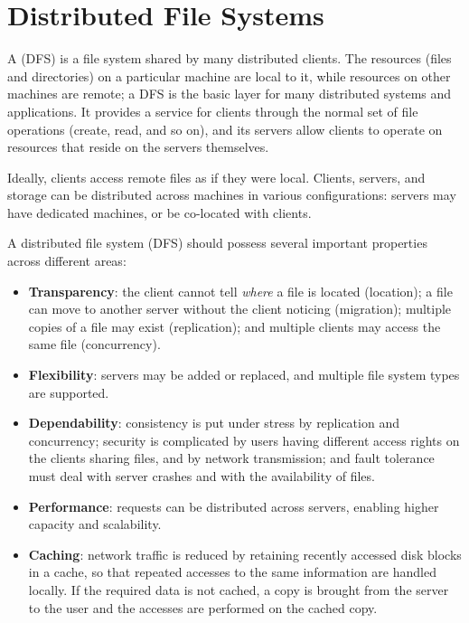 \section{Distributed File Systems} \label{sec:dfs}

\begin{definitionblock}
    A  (DFS) is a file system shared by many distributed clients. The resources (files and directories) on a particular machine are local to it, while resources on other machines are remote; a DFS is the basic layer for many distributed systems and applications. It provides a service for clients through the normal set of file operations (create, read, and so on), and its servers allow clients to operate on resources that reside on the servers themselves.
\end{definitionblock}

Ideally, clients access remote files as if they were local. Clients, servers, and storage can be distributed across machines in various configurations: servers may have dedicated machines, or be co-located with clients. 

\medskip

A distributed file system (DFS) should possess several important properties across different areas:

\smallskip

\begin{itemize}
    \item \textbf{Transparency}: the client cannot tell \emph{where} a file is located (location); a file can move to another server without the client noticing (migration); multiple copies of a file may exist (replication); and multiple clients may access the same file (concurrency).
    \item \textbf{Flexibility}: servers may be added or replaced, and multiple file system types are supported.
    \item \textbf{Dependability}: consistency is put under stress by replication and concurrency; security is complicated by users having different access rights on the clients sharing files, and by network transmission; and fault tolerance must deal with server crashes and with the availability of files.
    \item \textbf{Performance}: requests can be distributed across servers, enabling higher capacity and scalability.
    \item \textbf{Caching}: network traffic is reduced by retaining recently accessed disk blocks in a cache, so that repeated accesses to the same information are handled locally. If the required data is not cached, a copy is brought from the server to the user and the accesses are performed on the cached copy.
\end{itemize}

